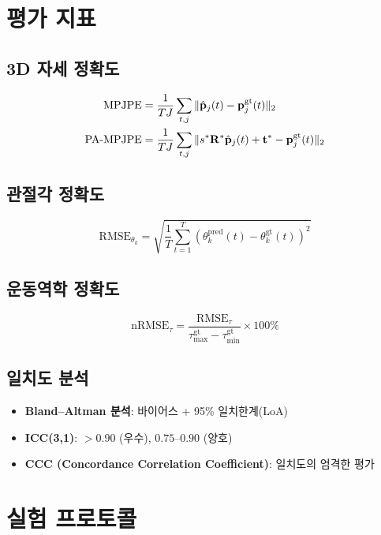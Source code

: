 \documentclass[11pt, a4paper]{report}
\begin{document}
\section{평가 지표}

\subsection{3D 자세 정확도}

\begin{align}
  \text{MPJPE} &= \frac{1}{TJ}\sum_{t,j}\|\hat{\mathbf{p}}_j(t) - \mathbf{p}_j^{\text{gt}}(t)\|_2 \label{eq:mpjpe} \\
  \text{PA-MPJPE} &= \frac{1}{TJ}\sum_{t,j}\|s^*\mathbf{R}^*\hat{\mathbf{p}}_j(t) + \mathbf{t}^* - \mathbf{p}_j^{\text{gt}}(t)\|_2 \label{eq:pampjpe}
\end{align}

\subsection{관절각 정확도}

\begin{equation}
  \text{RMSE}_{\theta_k} = \sqrt{\frac{1}{T}\sum_{t=1}^{T}(\theta_k^{\text{pred}}(t) - \theta_k^{\text{gt}}(t))^2}
\end{equation}

\subsection{운동역학 정확도}

\begin{equation}
  \text{nRMSE}_\tau = \frac{\text{RMSE}_\tau}{\tau_{\max}^{\text{gt}} - \tau_{\min}^{\text{gt}}} \times 100\%
\end{equation}

\subsection{일치도 분석}

\begin{itemize}[nosep]
  \item \textbf{Bland--Altman 분석}: 바이어스 + 95\% 일치한계(LoA)
  \item \textbf{ICC(3,1)}: $> 0.90$ (우수), $0.75$--$0.90$ (양호)
  \item \textbf{CCC (Concordance Correlation Coefficient)}: 일치도의 엄격한 평가
\end{itemize}


\section{실험 프로토콜}
\end{document}
